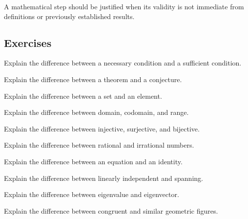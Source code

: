 A mathematical step should be justified when its validity is not immediate
from definitions or previously established results.

\subsection{Exercises}
\label{subsec:mathematical-terminology-exercises}

\begin{exercise}[1]
Explain the difference between a necessary condition and a sufficient
condition.
\end{exercise}

\begin{exercise}[1]
Explain the difference between a theorem and a conjecture.
\end{exercise}

\begin{exercise}[1]
Explain the difference between a set and an element.
\end{exercise}

\begin{exercise}[1]
Explain the difference between domain, codomain, and range.
\end{exercise}

\begin{exercise}[1]
Explain the difference between injective, surjective, and bijective.
\end{exercise}

\begin{exercise}[1]
Explain the difference between rational and irrational numbers.
\end{exercise}

\begin{exercise}[1]
Explain the difference between an equation and an identity.
\end{exercise}

\begin{exercise}[1]
Explain the difference between linearly independent and spanning.
\end{exercise}

\begin{exercise}[1]
Explain the difference between eigenvalue and eigenvector.
\end{exercise}

\begin{exercise}[1]
Explain the difference between congruent and similar geometric figures.
\end{exercise}


